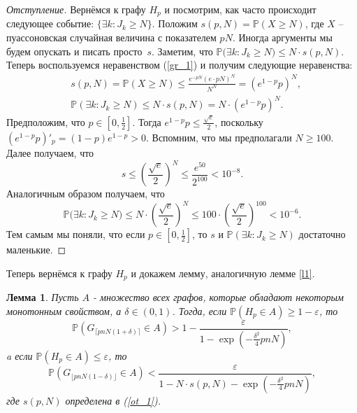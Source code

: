\documentclass{matmex-diploma-custom}
\newcommand{\PRob}{\mathbb P}
\newcommand{\leqs}{\leqslant}
\newcommand{\geqs}{\geqslant}
\newcommand{\eps}{\varepsilon}
\newtheorem{lemma}{Лемма}
\theoremstyle{named}
\begin{document}
\smallskip

\begin{proof}[Отступление]
Вернёмся к графу $H_p$ и посмотрим, как часто происходит следующее событие: $\{\exists k : J_k \geqs N\}$.
Положим $s(p, N) = \PRob(X \geqs N)$, где $X$ -- пуассоновская случайная величина с показателем $pN$.
Иногда аргументы мы будем опускать и писать просто~$s$.
Заметим, что $\PRob\big(\exists k : J_k \geqs N\big) \leqs N \cdot s(p, N)$. 
Теперь воспользуемся неравенством (\ref{gr_1}) и получим следующие неравенства:
\begin{align}\label{ot_1}
&s(p,N) = \PRob(X \geqs N) \leqs \frac{e^{-pN}(e\cdot pN)^N}{N^N} = (e^{1-p} p )^N,
\\ \label{s_1}
&\PRob(\exists k : J_k \geqs N) \leqs N \cdot s(p, N) = N \cdot (e^{1-p} p )^N.
\end{align} 
Предположим, что $p \in [0, \frac{1}{2}]$. Тогда $e^{1-p} p \leqs \frac{\sqrt{e}}{2}$, 
поскольку $(e^{1-p} p)'_p = (1-p) e^{1-p} > 0$. 
Вспомним, что мы предполагали $N \geqs 100$. Далее получаем, что 
\begin{equation}
s \leqs \left(\frac{\sqrt{e}}{2}\right)^N \leqs \frac{e^{50}}{2^{100}} < 10^{-8}.
\end{equation}
Аналогичным образом получаем, что 
\begin{equation}
\PRob\big(\exists k : J_k \geqs N\big) \leqs N \cdot \left(\frac{\sqrt{e}}{2}\right)^N
\leqs 100 \cdot \left(\frac{\sqrt{e}}{2}\right)^{100} < 10^{-6}.
\end{equation}
Тем самым мы поняли, что если $p \in [0, \frac{1}{2}]$, то $s$ и $\PRob(\exists k : J_k \geqs N)$ достаточно маленькие.
\end{proof}

Теперь вернёмся к графу $H_p$ и докажем лемму, аналогичную лемме \ref{l1}.

\begin{lemma} \label{l3}
Пусть $A$ - множество всех графов, которые обладают некоторым монотонным свойством, а $\delta \in (0,1)$.
Тогда, если $\PRob( H_p \in A) \geqs 1 - \eps$, то
\begin{equation} \label{l3_1}
\PRob(G_{\lceil pnN(1+\delta) \rceil} \in A) > 1 - \frac{\eps}{1 - \exp\left(-\frac{\delta^2}{4}pnN\right)},
\end{equation}
a если $\PRob( H_p \in A) \leqs \eps$, то
\begin{equation}\label{l3_2}
\PRob(G_{\lfloor pnN(1-\delta) \rfloor} \in A) < \frac{\eps}{1 - N \cdot s(p, N) - \exp\left(-\frac{\delta^2}{4}pnN\right)},
\end{equation}
где $s(p, N)$ определена в (\ref{ot_1}).
\end{lemma}
\end{document}
